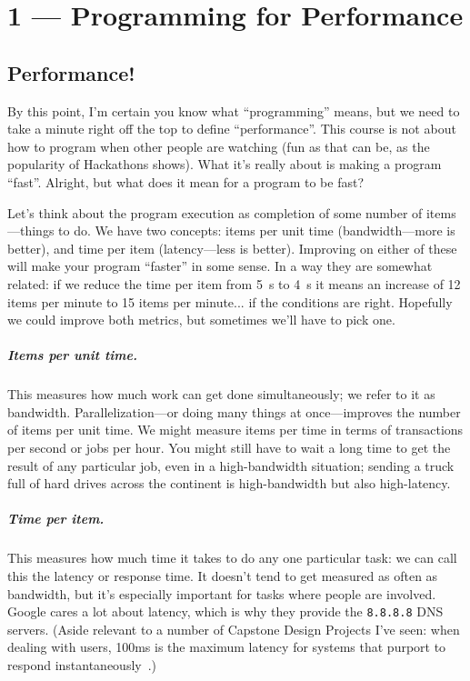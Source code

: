 \documentclass[a4paper]{report}
\begin{document}
\tableofcontents


\chapter*{1 --- Programming for Performance}


\section*{Performance!}
By this point, I'm certain you know what ``programming'' means, but we need to take a minute right off the top to define ``performance''. This course is not about how to program when other people are watching (fun as that can be, as the popularity of Hackathons shows). What it's really about is making a program ``fast''. Alright, but what does it mean for a program to be fast?

Let's think about the program execution as completion of some number of items---things to do. We have two concepts: items per unit time (bandwidth---more is better), and time per item (latency---less is better). Improving on either of these will make your program ``faster'' in some sense. In a way they are somewhat related: if we reduce the time per item from 5~s to 4~s it means an increase of 12 items per minute to 15 items per minute... if the conditions are right. Hopefully we could improve both metrics, but sometimes we'll have to pick one.

\paragraph{Items per unit time.} This measures how much work can get 
done simultaneously; we refer to it as bandwidth.
Parallelization---or doing many things at once---improves the number
of items per unit time. We might measure items per time in terms of
transactions per second or jobs per hour. You might still have to wait
a long time to get the result of any particular job, even in a
high-bandwidth situation; sending a truck full of hard drives across
the continent is high-bandwidth but also high-latency.

\paragraph{Time per item.} This measures how much time it takes to do
any one particular task: we can call this the latency or response time.
It doesn't tend to get measured as often as bandwidth, but it's especially
important for tasks where people are involved. Google cares a lot about
latency, which is why they provide the {\tt 8.8.8.8} DNS servers.
(Aside relevant to a number of Capstone Design Projects I've seen:
when dealing with users, 100ms is the maximum latency for
systems that purport to respond instantaneously~\cite{nielsen93:_respon_times}.)
\end{document}
